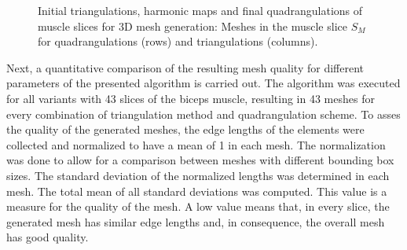 \begin{figure}
\begin{subfigure}[t]{0.24\textwidth}
    \label{fig:tri_23}%
  \end{subfigure}
  \caption{Initial triangulations, harmonic maps and final quadrangulations of muscle slices for 3D mesh generation: Meshes in the muscle slice $S_M$ for quadrangulations (rows) and triangulations (columns).}%
  \label{fig:tri_meshes}%
\end{figure}%



Next, a quantitative comparison of the resulting mesh quality for different parameters of the presented algorithm is carried out. 
The algorithm was executed for all variants with 43 slices of the biceps muscle, resulting in 43 meshes for every combination of triangulation method and quadrangulation scheme. To asses the quality of the generated meshes, the edge lengths of the elements were collected and normalized to have a mean of 1 in each mesh. 
The normalization was done to allow for a comparison between meshes with different bounding box sizes.
The standard deviation of the normalized lengths was determined in each mesh. The total mean of all standard deviations was computed. This value is a measure for the quality of the mesh. A low value means that, in every slice, the generated mesh has similar edge lengths and, in consequence, the overall mesh has good quality.

